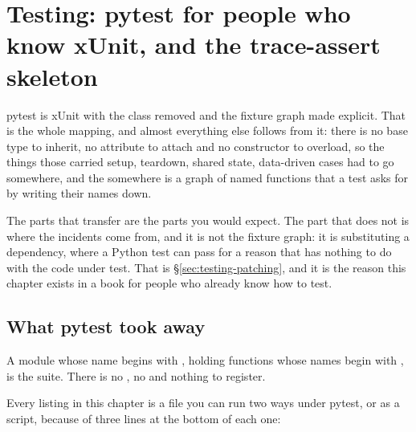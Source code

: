 
\chapter{Testing: pytest for people who know xUnit, and the trace-assert skeleton}
\label{ch:testing}

\noindent
pytest is xUnit with the class removed and the fixture graph made explicit.
That is the whole mapping, and almost everything else follows from it: there
is no base type to inherit, no attribute to attach and no constructor to
overload, so the things those carried \dash{} setup, teardown, shared state,
data-driven cases \dash{} had to go somewhere, and the somewhere is a graph
of named functions that a test asks for by writing their names down.

The parts that transfer are the parts you would expect. The part that does
not is where the incidents come from, and it is not the fixture graph: it is
substituting a dependency, where a Python test can pass for a reason that
has nothing to do with the code under test. That is
\S\ref{sec:testing-patching}, and it is the reason this chapter exists in a
book for people who already know how to test.

\section{What pytest took away}
\label{sec:testing-discovery}

A module whose name begins with , holding functions whose names
begin with , is the suite. There is no \code{[Fact]}, no
 and nothing to register.


\noindent
Every listing in this chapter is a file you can run two ways \dash{} under
pytest, or as a script, because of three lines at the bottom of each one:

